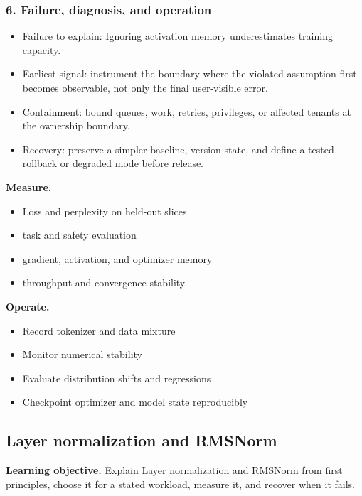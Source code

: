 \subsubsection*{6. Failure, diagnosis, and operation}
\begin{itemize}
\item Failure to explain: Ignoring activation memory underestimates training capacity.
\item Earliest signal: instrument the boundary where the violated assumption first becomes observable, not only the final user-visible error.
\item Containment: bound queues, work, retries, privileges, or affected tenants at the ownership boundary.
\item Recovery: preserve a simpler baseline, version state, and define a tested rollback or degraded mode before release.
\end{itemize}
\textbf{Measure.}\begin{itemize}
\item Loss and perplexity on held-out slices
\item task and safety evaluation
\item gradient, activation, and optimizer memory
\item throughput and convergence stability
\end{itemize}
\textbf{Operate.}\begin{itemize}
\item Record tokenizer and data mixture
\item Monitor numerical stability
\item Evaluate distribution shifts and regressions
\item Checkpoint optimizer and model state reproducibly
\end{itemize}
\subsection{Layer normalization and RMSNorm}
\textbf{Learning objective.} Explain Layer normalization and RMSNorm from first principles, choose it for a stated workload, measure it, and recover when it fails.
